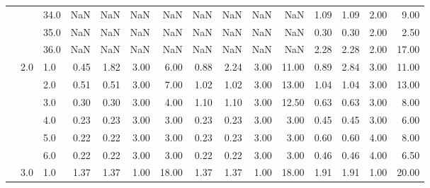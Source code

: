\begin{tabular}{lllrrrrrrrrrrrr}
       &     & 34.0 &        NaN &       NaN &  NaN &    NaN &        NaN &       NaN &   NaN &    NaN &       1.09 &      1.09 &  2.00 &   9.00 \\
       &     & 35.0 &        NaN &       NaN &  NaN &    NaN &        NaN &       NaN &   NaN &    NaN &       0.30 &      0.30 &  2.00 &   2.50 \\
       &     & 36.0 &        NaN &       NaN &  NaN &    NaN &        NaN &       NaN &   NaN &    NaN &       2.28 &      2.28 &  2.00 &  17.00 \\
       & 2.0 & 1.0  &       0.45 &      1.82 & 3.00 &   6.00 &       0.88 &      2.24 &  3.00 &  11.00 &       0.89 &      2.84 &  3.00 &  11.00 \\
       &     & 2.0  &       0.51 &      0.51 & 3.00 &   7.00 &       1.02 &      1.02 &  3.00 &  13.00 &       1.04 &      1.04 &  3.00 &  13.00 \\
       &     & 3.0  &       0.30 &      0.30 & 3.00 &   4.00 &       1.10 &      1.10 &  3.00 &  12.50 &       0.63 &      0.63 &  3.00 &   8.00 \\
       &     & 4.0  &       0.23 &      0.23 & 3.00 &   3.00 &       0.23 &      0.23 &  3.00 &   3.00 &       0.45 &      0.45 &  3.00 &   6.00 \\
       &     & 5.0  &       0.22 &      0.22 & 3.00 &   3.00 &       0.23 &      0.23 &  3.00 &   3.00 &       0.60 &      0.60 &  4.00 &   8.00 \\
       &     & 6.0  &       0.22 &      0.22 & 3.00 &   3.00 &       0.22 &      0.22 &  3.00 &   3.00 &       0.46 &      0.46 &  4.00 &   6.50 \\
       & 3.0 & 1.0  &       1.37 &      1.37 & 1.00 &  18.00 &       1.37 &      1.37 &  1.00 &  18.00 &       1.91 &      1.91 &  1.00 &  20.00 \\
\bottomrule
\end{tabular}
